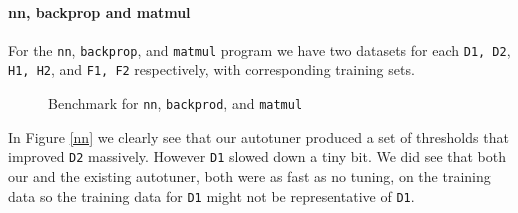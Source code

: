 \paragraph{nn, backprop and matmul}
For the \texttt{nn}, \texttt{backprop}, and \texttt{matmul} program we have two datasets for each \texttt{D1, D2}, \texttt{H1, H2}, and \texttt{F1, F2} respectively, with corresponding training sets. 
\begin{figure}[h]
	\centering
	\hspace{5mm}
	\hspace{5mm}
	\caption{Benchmark for \texttt{nn}, \texttt{backprod}, and \texttt{matmul}}
	\label{NNandBackprop}
\end{figure}
In Figure \ref{nn} we clearly see that our autotuner produced a set of thresholds that improved \texttt{D2} massively. However \texttt{D1} slowed down a tiny bit. We did see that both our and the existing autotuner, both were as fast as no tuning, on the training data 
so the training data for \texttt{D1} might not be representative of \texttt{D1}. 

